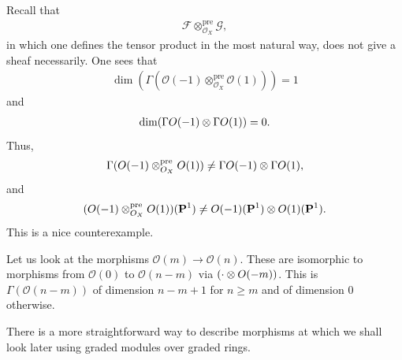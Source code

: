 \documentclass [11 pt, oneside] {article}
\begin{document}
Recall that 
\begin{align*}
	\mathscr{F}\otimes^{\textrm{pre}}_{\mathscr{O}_X} \mathscr{G},
\end{align*}
in which one defines the tensor product in the most natural way, does not give a sheaf necessarily. One sees that
\begin{align*}
	\dim( \Gamma(\mathscr{O}(-1) \otimes^{\textrm{pre}}_{\mathscr{O}_X} \mathscr{O}(1) )) = 1
\end{align*}
and 
\begin{align*}
	\dim(\Gamma\relax{O}(-1) \otimes \Gamma\relax{O}(1) ) = 0.
\end{align*}
Thus, 
\begin{align*}
	\Gamma(\relax{O}(-1) \otimes^{\textrm{pre}}_{\relax{O}_X} \relax{O}(1) ) \ne \Gamma\relax{O}(-1) \otimes \Gamma\relax{O}(1),
\end{align*}
and
\begin{align*}
	(\relax{O}(-1) \otimes^{\textrm{pre}}_{\relax{O}_X} \relax{O}(1))(\mathbf{P}^1) \ne \relax{O}(-1) (\mathbf{P}^1) \otimes \relax{O}(1) (\mathbf{P}^1).
\end{align*}
This is a nice counterexample.

Let us look at the morphisms $\mathscr{O}(m) \longrightarrow \mathscr{O}(n)$. These are isomorphic to morphisms from $\mathscr{O}(0)$ to $\mathscr{O}(n-m)$ via $(\cdot\otimes \relax{O}(-m))$. This is $\Gamma(\mathscr{O}(n-m))$ of dimension $n-m+1$ for $n\ge m$ and of dimension $0$ otherwise.

\begin{remark}
	There is a more straightforward way to describe morphisms at which we shall look later using graded modules over graded rings.
\end{remark}
\end{document}
